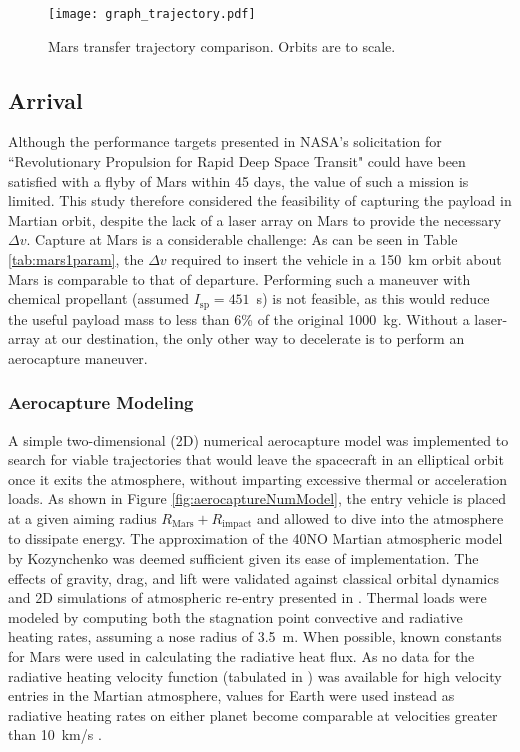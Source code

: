 \documentclass[final,3p,times,twocolumn,sort&compress, lefttitle]{elsarticle}
\begin{document}
            \begin{figure}[t]
                \centering
                \texttt{[image: graph\_trajectory.pdf]}
                \caption{Mars transfer trajectory comparison. Orbits are to scale.}
                \label{fig:transferPlot}
            \end{figure}
            
        \subsection{Arrival}
            Although the performance targets presented in NASA's solicitation for ``Revolutionary Propulsion for Rapid Deep Space Transit" could have been satisfied with a flyby of Mars within 45 days, the value of such a mission is limited. This study therefore considered the feasibility of capturing the payload in Martian orbit, despite the lack of a laser array on Mars to provide the necessary $\Delta v$. Capture at Mars is a considerable challenge: As can be seen in Table \ref{tab:mars1param}, the $\Delta v$ required to insert the vehicle in a 150~km orbit about Mars is comparable to that of departure. Performing such a maneuver with chemical propellant (assumed $I_\mathrm{sp} = 451$~s) is not feasible, as this would reduce the useful payload mass to less than 6\% of the original 1000~kg. Without a laser-array at our destination, the only other way to decelerate is to perform an aerocapture maneuver.
            
            \subsubsection{Aerocapture Modeling}
                A simple two-dimensional (2D) numerical aerocapture model was implemented to search for viable trajectories that would leave the spacecraft in an elliptical orbit once it exits the atmosphere, without imparting excessive thermal or acceleration loads. As shown in Figure \ref{fig:aerocaptureNumModel}, the entry vehicle is placed at a given aiming radius $R_\mathrm{Mars} + R_\mathrm{impact}$ and allowed to dive into the atmosphere to dissipate energy. The approximation of the 40NO Martian atmospheric model by Kozynchenko \cite{kozynchenko_analysis_2011} was deemed sufficient given its ease of implementation. The effects of gravity, drag, and lift were validated against classical orbital dynamics and 2D simulations of atmospheric re-entry presented in \cite{kluever_space_2018}. Thermal loads were modeled by computing both the stagnation point convective \cite{sutton_general_1971} and radiative \cite{tauber_stagnation-point_1991} heating rates, assuming a nose radius of 3.5~m. When possible, known constants for Mars were used in calculating the radiative heat flux. As no data for the radiative heating velocity function (tabulated in \cite{tauber_stagnation-point_1991}) was available for high velocity entries in the Martian atmosphere, values for Earth were used instead as radiative heating rates on either planet become comparable at velocities greater than 10~km/s \cite{lohar_optimal_1995}.
                
\end{document}
